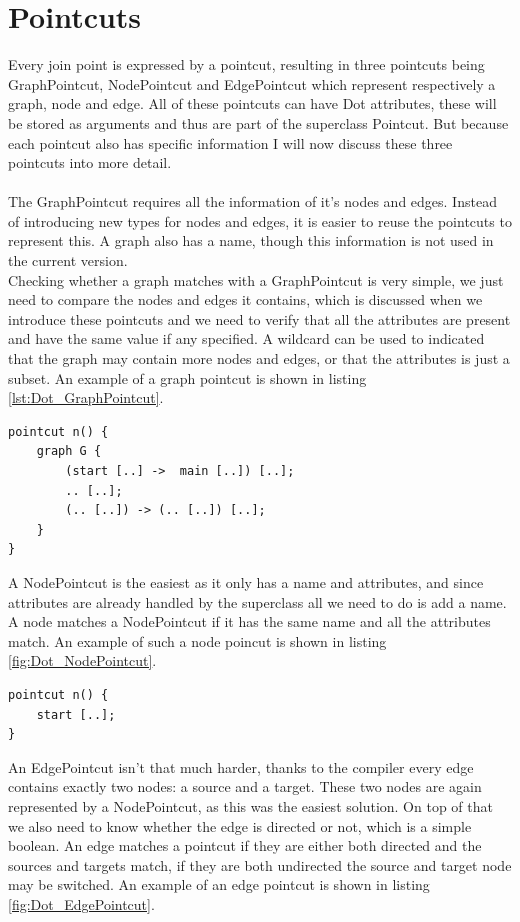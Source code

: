 \documentclass[a4paper]{report}
\begin{document}
\section{Pointcuts}
Every join point is expressed by a pointcut, resulting in three pointcuts being GraphPointcut, NodePointcut and EdgePointcut which represent respectively a graph, node and edge. All of these pointcuts can have Dot attributes, these will be stored as arguments and thus are part of the superclass Pointcut. But because each pointcut also has specific information I will now discuss these three pointcuts into more detail.\\
\\
The GraphPointcut requires all the information of it's nodes and edges. Instead of introducing new types for nodes and edges, it is easier to reuse the pointcuts to represent this. A graph also has a name, though this information is not used in the current version.\\
Checking whether a graph matches with a GraphPointcut is very simple, we just need to compare the nodes and edges it contains, which is discussed when we introduce these pointcuts and we need to verify that all the attributes are present and have the same value if any specified. A wildcard can be used to indicated that the graph may contain more nodes and edges, or that the attributes is just a subset. An example of a graph pointcut is shown in listing \ref{lst:Dot_GraphPointcut}.
\begin{lstlisting}[caption=A graph pointcut matching any graph G with an edge from start to main, label=lst:Dot_GraphPointcut]
pointcut n() {
	graph G {
		(start [..] ->  main [..]) [..];
		.. [..];
		(.. [..]) -> (.. [..]) [..];
	}
}
\end{lstlisting}
A NodePointcut is the easiest as it only has a name and attributes, and since attributes are already handled by the superclass all we need to do is add a name. A node matches a NodePointcut if it has the same name and all the attributes match. An example of such a node poincut is shown in listing \ref{fig:Dot_NodePointcut}.
\begin{lstlisting}[caption=A node pointcut matching any node start, label=lst:Dot_NodePointcut]
pointcut n() {
	start [..];
}
\end{lstlisting}
An EdgePointcut isn't that much harder, thanks to the compiler every edge contains exactly two nodes: a source and a target. These two nodes are again represented by a NodePointcut, as this was the easiest solution. On top of that we also need to know whether the edge is directed or not, which is a simple boolean. An edge matches a pointcut if they are either both directed and the sources and targets match, if they are both undirected the source and target node may be switched. An example of an edge pointcut is shown in listing \ref{fig:Dot_EdgePointcut}.
\end{document}
